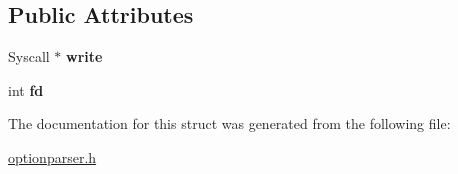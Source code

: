 \subsection*{Public Attributes}
\begin{DoxyCompactItemize}
\item 
\mbox{\label{structoption_1_1PrintUsageImplementation_1_1SyscallWriter_adc72b04cd74c69d0219b8b26589b8e5e}} 
Syscall $\ast$ {\bfseries write}
\item 
\mbox{\label{structoption_1_1PrintUsageImplementation_1_1SyscallWriter_ae79409e3f85f8dbaa7ef87bb8d7fcf8a}} 
int {\bfseries fd}
\end{DoxyCompactItemize}


The documentation for this struct was generated from the following file\+:\begin{DoxyCompactItemize}
\item 
\hyperlink{optionparser_8h}{optionparser.\+h}\end{DoxyCompactItemize}
